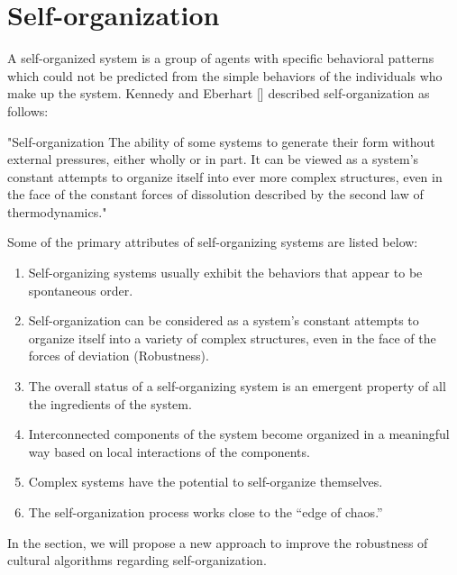 \section{Self-organization}
A self-organized system is a group of agents with specific behavioral patterns which could not be predicted from the simple behaviors of the  individuals who make up the system. Kennedy and Eberhart [] described self-organization as follows: 
\begin{displayquote}
	"Self-organization The ability of some systems to generate their form without external pressures, either wholly or in part. It can be viewed as a system’s constant attempts to organize itself into ever more complex structures, even in the face of the constant forces of dissolution described by the second law of thermodynamics."
\end{displayquote}
Some of the primary attributes of self-organizing systems are listed below:
\begin{enumerate}
	\item Self-organizing systems usually exhibit the behaviors that appear to be spontaneous order.
	\item Self-organization can be considered as a system’s constant attempts to organize itself into a variety of complex structures, even in the face of the forces of deviation (Robustness).
	\item The overall status of a self-organizing system is an emergent property of all the ingredients of the system.
	\item Interconnected components of the system become organized in a meaningful way based on local interactions of the components.
	\item Complex systems have the potential to self-organize themselves.
	\item The self-organization process works close to the “edge of chaos.”
\end{enumerate}
In the section, we will propose a new approach to improve the robustness of cultural algorithms regarding self-organization.
